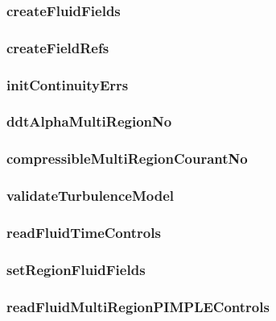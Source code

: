 \subsubsection*{createFluidFields}

\subsubsection*{createFieldRefs}

\subsubsection*{initContinuityErrs}

\subsubsection*{ddtAlphaMultiRegionNo}

\subsubsection*{compressibleMultiRegionCourantNo}

\subsubsection*{validateTurbulenceModel}

\subsubsection*{readFluidTimeControls}

\subsubsection*{setRegionFluidFields}

\subsubsection*{readFluidMultiRegionPIMPLEControls}

